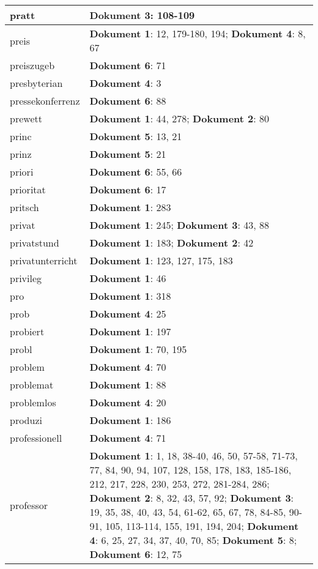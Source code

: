 \documentclass[a5paper]{article}
\begin{document}
\begin{longtable}[l]{|l|p{3in}|}
\hline
pratt & \textbf{Dokument 3}: 108-109 \\
\hline
preis & \textbf{Dokument 1}: 12, 179-180, 194; \textbf{Dokument 4}: 8, 67 \\
\hline
preiszugeb & \textbf{Dokument 6}: 71 \\
\hline
presbyterian & \textbf{Dokument 4}: 3 \\
\hline
pressekonferrenz & \textbf{Dokument 6}: 88 \\
\hline
prewett & \textbf{Dokument 1}: 44, 278; \textbf{Dokument 2}: 80 \\
\hline
princ & \textbf{Dokument 5}: 13, 21 \\
\hline
prinz & \textbf{Dokument 5}: 21 \\
\hline
priori & \textbf{Dokument 6}: 55, 66 \\
\hline
prioritat & \textbf{Dokument 6}: 17 \\
\hline
pritsch & \textbf{Dokument 1}: 283 \\
\hline
privat & \textbf{Dokument 1}: 245; \textbf{Dokument 3}: 43, 88 \\
\hline
privatstund & \textbf{Dokument 1}: 183; \textbf{Dokument 2}: 42 \\
\hline
privatunterricht & \textbf{Dokument 1}: 123, 127, 175, 183 \\
\hline
privileg & \textbf{Dokument 1}: 46 \\
\hline
pro & \textbf{Dokument 1}: 318 \\
\hline
prob & \textbf{Dokument 4}: 25 \\
\hline
probiert & \textbf{Dokument 1}: 197 \\
\hline
probl & \textbf{Dokument 1}: 70, 195 \\
\hline
problem & \textbf{Dokument 4}: 70 \\
\hline
problemat & \textbf{Dokument 1}: 88 \\
\hline
problemlos & \textbf{Dokument 4}: 20 \\
\hline
produzi & \textbf{Dokument 1}: 186 \\
\hline
professionell & \textbf{Dokument 4}: 71 \\
\hline
professor & \textbf{Dokument 1}: 1, 18, 38-40, 46, 50, 57-58, 71-73, 77, 84, 90, 94, 107, 128, 158, 178, 183, 185-186, 212, 217, 228, 230, 253, 272, 281-284, 286; \textbf{Dokument 2}: 8, 32, 43, 57, 92; \textbf{Dokument 3}: 19, 35, 38, 40, 43, 54, 61-62, 65, 67, 78, 84-85, 90-91, 105, 113-114, 155, 191, 194, 204; \textbf{Dokument 4}: 6, 25, 27, 34, 37, 40, 70, 85; \textbf{Dokument 5}: 8; \textbf{Dokument 6}: 12, 75 \\

\end{longtable}
\end{document}
